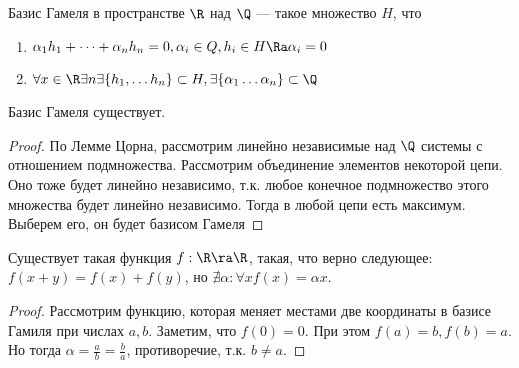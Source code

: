 \begin{definition}
    Базис Гамеля в пространстве  \(\R\) над \(\Q\) --- такое множество \(H\), что 
    \begin{enumerate}
        \item \(\alpha_1h_1 + \dots + \alpha_nh_n = 0, \alpha_i \in Q, h_i \in H \Ra \alpha_i = 0\)
        \item \(\forall x \in \R \exists n \exists \{h_1,\dots h_n\} \subset H, \exists \{\alpha_1 \dots \alpha_n\} \subset \Q\)
    \end{enumerate}
\end{definition}
\begin{theorem}
    Базис Гамеля существует.
\end{theorem}
\begin{proof}
    По Лемме Цорна, рассмотрим линейно независимые над \(\Q\) системы с отношением подмножества. Рассмотрим объединение элементов некоторой цепи. Оно тоже будет линейно независимо, т.к. любое конечное подмножество этого множества будет линейно независимо. Тогда в любой цепи есть максимум. Выберем его, он будет базисом Гамеля
\end{proof}

\begin{theorem}
    Существует такая функция \(f: \R \ra \R\), такая, что верно следующее: \(f(x + y) = f(x) + f(y)\), но \(\nexists \alpha: \forall x f(x) = \alpha x\).
\end{theorem}
\begin{proof}
    Рассмотрим функцию, которая меняет местами две координаты в базисе Гамиля при числах \(a, b\). Заметим, что \(f(0) = 0\). При этом \(f(a) = b, f(b) = a\). Но тогда \(\alpha = \frac{a}{b} = \frac{b}{a}\), противоречие, т.к. \(b \ne a\).
\end{proof}